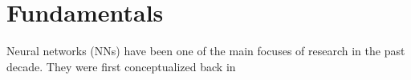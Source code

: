 \chapter{Fundamentals}\label{chapter:fundamentals}

Neural networks (NNs) have been one of the main focuses of research in the past decade.
They were first conceptualized back in 
